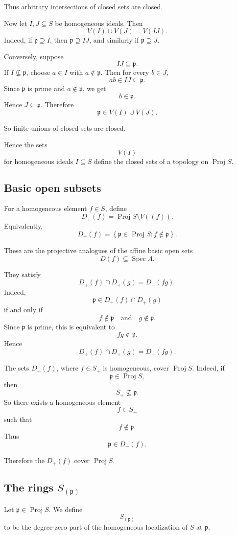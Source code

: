 \documentclass[12pt,a4paper]{article}
\DeclareMathOperator{\Spec}{Spec}
\DeclareMathOperator{\Proj}{Proj}
\theoremstyle{notespace}
\begin{document}
Thus arbitrary intersections of closed sets are closed.

Now let \(I,J\subseteq S\) be homogeneous ideals. Then
\[
V(I)\cup V(J)=V(IJ).
\]
Indeed, if \(\mathfrak p\supseteq I\), then \(\mathfrak p\supseteq IJ\), and similarly if
\(\mathfrak p\supseteq J\).

Conversely, suppose
\[
IJ\subseteq \mathfrak p.
\]
If \(I\not\subseteq \mathfrak p\), choose \(a\in I\) with \(a\notin \mathfrak p\). Then for every
\(b\in J\),
\[
ab\in IJ\subseteq \mathfrak p.
\]
Since \(\mathfrak p\) is prime and \(a\notin \mathfrak p\), we get
\[
b\in \mathfrak p.
\]
Hence \(J\subseteq \mathfrak p\). Therefore
\[
\mathfrak p\in V(I)\cup V(J).
\]

So finite unions of closed sets are closed.

Hence the sets
\[
V(I)
\]
for homogeneous ideals \(I\subseteq S\) define the closed sets of a topology on
\(\Proj S\).

\subsection{Basic open subsets}

For a homogeneous element \(f\in S\), define
\[
D_+(f)
=
\Proj S\setminus V((f)).
\]
Equivalently,
\[
D_+(f)
=
\left\{
\mathfrak p\in \Proj S : f\notin \mathfrak p
\right\}.
\]

These are the projective analogues of the affine basic open sets
\[
D(f)\subseteq \Spec A.
\]

They satisfy
\[
D_+(f)\cap D_+(g)=D_+(fg).
\]
Indeed,
\[
\mathfrak p\in D_+(f)\cap D_+(g)
\]
if and only if
\[
f\notin \mathfrak p
\quad\text{and}\quad
g\notin \mathfrak p.
\]
Since \(\mathfrak p\) is prime, this is equivalent to
\[
fg\notin \mathfrak p.
\]
Hence
\[
D_+(f)\cap D_+(g)=D_+(fg).
\]

The sets \(D_+(f)\), where \(f\in S_+\) is homogeneous, cover \(\Proj S\). Indeed, if
\[
\mathfrak p\in \Proj S,
\]
then
\[
S_+\not\subseteq \mathfrak p.
\]
So there exists a homogeneous element
\[
f\in S_+
\]
such that
\[
f\notin \mathfrak p.
\]
Thus
\[
\mathfrak p\in D_+(f).
\]

Therefore the \(D_+(f)\) cover \(\Proj S\).

\subsection{The rings \texorpdfstring{$S_{(\mathfrak p)}$}{S(p)}}

Let \(\mathfrak p\in \Proj S\). We define
\[
S_{(\mathfrak p)}
\]
to be the degree-zero part of the homogeneous localization of \(S\) at
\(\mathfrak p\).
\end{document}
